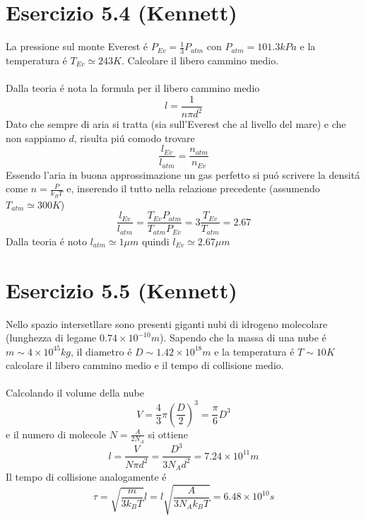 \documentclass[a4paper]{article}
\begin{document}
    \section*{Esercizio 5.4 (Kennett)}
        La pressione sul monte Everest \'e $P_{Ev}=\frac{1}{3}P_{atm}$ con $P_{atm}=101.3kPa$ e la temperatura \'e $T_{Ev}\simeq 243K$.
        Calcolare il libero cammino medio.
        \\
        \\
        Dalla teoria \'e nota la formula per il libero cammino medio
        \begin{equation*}
            l=\frac{1}{n\pi d^2}
        \end{equation*}
        Dato che sempre di aria si tratta (sia sull'Everest che al livello del mare) e che non sappiamo $d$, risulta pi\'u comodo trovare
        \begin{equation*}
            \frac{l_{Ev}}{l_{atm}}=\frac{n_{atm}}{n_{Ev}}
        \end{equation*}
        Essendo l'aria in buona approssimazione un gas perfetto si pu\'o scrivere la densit\'a come $n=\frac{P}{k_BT}$ e, inserendo il tutto nella relazione precedente (assumendo $T_{atm}\simeq300K$)
        \begin{equation*}
            \frac{l_{Ev}}{l_{atm}}=\frac{T_{Ev}P_{atm}}{T_{atm}P_{Ev}}=3\frac{T_{Ev}}{T_{atm}}=2.67
        \end{equation*}
        Dalla teoria \'e noto $l_{atm}\simeq 1\mu m$ quindi $l_{Ev}\simeq 2.67\mu m$

    \section*{Esercizio 5.5 (Kennett)}
        Nello spazio intersetllare sono presenti giganti nubi di idrogeno molecolare (lunghezza di legame $0.74\times 10^{-10}m$).
        Sapendo che la massa di una nube \'e $m\sim 4\times 10^{45}kg$, il diametro \'e $D\sim 1.42\times 10^{18}m$ e la temperatura \'e $T\sim 10K$ calcolare il libero cammino medio e il tempo di collisione medio.
        \\
        \\
        Calcolando il volume della nube
        \begin{equation*}
            V=\frac{4}{3}\pi\left(\frac{D}{2}\right)^3=\frac{\pi}{6}D^3
        \end{equation*}
        e il numero di molecole $N=\frac{A}{2N_A}$ si ottiene
        \begin{equation*}
            l=\frac{V}{N\pi d^2}=\frac{D^3}{3N_Ad^2}=7.24\times 10^{11}m
        \end{equation*}
        Il tempo di collisione analogamente \'e
        \begin{equation*}
            \tau=\sqrt{\frac{m}{3k_BT}}l=l\sqrt{\frac{A}{3N_Ak_BT}}=6.48\times 10^{10}s
        \end{equation*}
\end{document}

